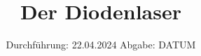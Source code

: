 

\subject{VERSUCH NUMMER 60}
\title{Der Diodenlaser}
\date{
  Durchführung: 22.04.2024
  \hspace{3em}
  Abgabe: DATUM
}



\maketitle
\thispagestyle{empty}
\tableofcontents
\newpage
\setcounter{page}{1}







\newpage
\printbibliography
\nocite{ap60}
\nocite{ap60.2}
\nocite{matplotlib}
\nocite{numpy}
\nocite{scipy}
\nocite{uncertainties}
\nocite{reback2020pandas}
\nocite{coherent}

\newpage
%
%


